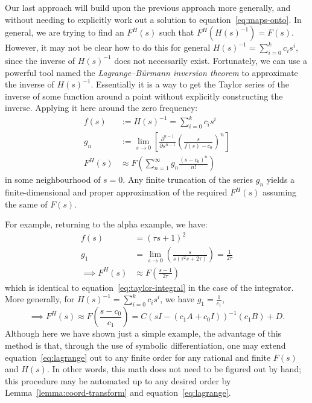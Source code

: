 Our last approach will build upon the previous approach more generally, and without needing to explicitly work out a solution to equation~\ref{eq:maps-onto}.
In general, we are trying to find an $F^H(s)$ such that $F^H(H(s)^{-1}) = F(s)$.
However, it may not be clear how to do this for general $H(s)^{-1} = \sum_{i=0}^k c_i s^i$, since the inverse of $H(s)^{-1}$ does not necessarily exist.
Fortunately, we can use a powerful tool named the {\it Lagrange--B\"urmann inversion theorem} to approximate the inverse of $H(s)^{-1}$.
Essentially it is a way to get the Taylor series of the inverse of some function around a point without explicitly constructing the inverse. Applying it here around the zero frequency:
\begin{align} \label{eq:lagrange}
f(s) &:= H(s)^{-1} = \sum_{i=0}^k c_i s^i \nonumber \\
g_n &:= \lim_{s \rightarrow 0} \left[ \frac{\partial^{n-1}}{\partial s^{n-1}} \left( \frac{s}{f(s) - c_0} \right)^n \right] \nonumber \\
F^H(s) &\approx F \left( \sum_{n=1}^\infty g_n \frac{(s - c_0)^n}{n!} \right)
\end{align}
in some neighbourhood of $s = 0$.
Any finite truncation of the series $g_n$ yields a finite-dimensional and proper approximation of the required $F^H(s)$ assuming the same of $F(s)$.

For example, returning to the alpha example, we have:
\begin{align*}
f(s) &= (\tau s + 1)^2 \\
g_1 &= \lim_{s \rightarrow 0} \left( \frac{s}{ s(\tau^2 s + 2 \tau)} \right) = \frac{1}{2 \tau} \\
\implies F^H(s) &\approx F \left( \frac{s - 1}{2\tau} \right)
\end{align*}
which is identical to equation~\ref{eq:taylor-integral} in the case of the integrator.
More generally, for $H(s)^{-1} = \sum_{i=0}^k c_i s^i$, we have $g_1 = \frac{1}{c_1}$,
\begin{equation}
\implies F^H(s) \approx F \left( \frac{s - c_0}{c_1} \right) = C \left( sI - (c_1 A + c_0 I) \right)^{-1} (c_1 B) + D.
\end{equation}
Although here we have shown just a simple example, the advantage of this method is that, through the use of symbolic differentiation, one may extend equation~\ref{eq:lagrange} out to any finite order for any rational and finite $F(s)$ and $H(s)$.
In other words, this math does not need to be figured out by hand; this procedure may be automated up to any desired order by Lemma~\ref{lemma:coord-transform} and equation~\ref{eq:lagrange}.

